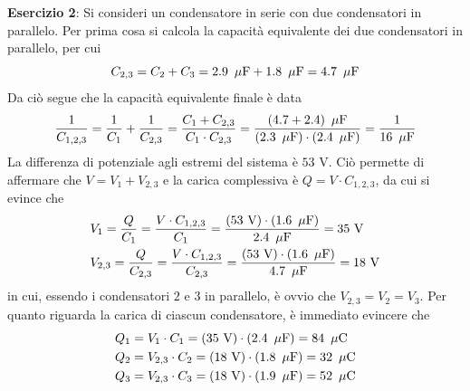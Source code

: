 \documentclass[a4paper]{extarticle}
\begin{document}
\vspace{2em}
\noindent
\textbf{Esercizio 2}: Si consideri un condensatore in serie con due condensatori in parallelo. Per prima cosa si calcola la capacità equivalente dei due condensatori in parallelo, per cui
\[C_{2,3}=C_2+C_3=2.9 \hspace{0.5em}\mu\text{F}+1.8 \hspace{0.5em}\mu\text{F} = 4.7 \hspace{0.5em}\mu\text{F}\]
Da ciò segue che la capacità equivalente finale è data
\[\frac{1}{C_{1,2,3}}=\frac{1}{C_1}+\frac{1}{C_{2,3}}=\frac{C_1 + C_{2,3}}{C_1 \cdot C_{2,3}} = \dfrac{(4.7+2.4)\hspace{0.5em}\mu\text{F}}{(2.3\hspace{0.5em}\mu\text{F}) \cdot (2.4\hspace{0.5em}\mu\text{F})} = \frac{1}{16\hspace{0.5em}\mu\text{F}}\]
La differenza di potenziale agli estremi del sistema è $53$ V. Ciò permette di affermare che $V=V_1+V_{2,3}$ e la carica complessiva è $Q=V \cdot C_{1,2,3}$, da cui si evince che
\begin{align*}
  &V_1=\frac{Q}{C_1}=\frac{V \cdot C_{1,2,3}}{C_1} = \frac{(53 \text{ V}) \cdot (1.6\hspace{0.5em}\mu\text{F})}{2.4\hspace{0.5em}\mu\text{F}} = 35 \text{ V}\\
  &V_{2,3}=\frac{Q}{C_{2,3}}=\frac{V \cdot C_{1,2,3}}{C_{2,3}} = \frac{(53 \text{ V}) \cdot (1.6\hspace{0.5em}\mu\text{F})}{4.7\hspace{0.5em}\mu\text{F}} = 18 \text{ V}\\
\end{align*}
in cui, essendo i condensatori $2$ e $3$ in parallelo, è ovvio che $V_{2,3}=V_2=V_3$. Per quanto riguarda la carica di ciascun condensatore, è immediato evincere che
\begin{align*}
  &Q_1=V_1 \cdot C_1 = (35\text{ V}) \cdot (2.4\hspace{0.5em}\mu\text{F}) = 84\hspace{0.5em}\mu\text{C}\\
  &Q_2=V_{2,3} \cdot C_2 = (18\text{ V}) \cdot (1.8\hspace{0.5em}\mu\text{F}) =32\hspace{0.5em}\mu\text{C}\\
  &Q_3=V_{2,3} \cdot C_3 = (18 \text{ V}) \cdot (1.9\hspace{0.5em}\mu\text{F})=52\hspace{0.5em}\mu\text{C}
\end{align*}
\end{document}
